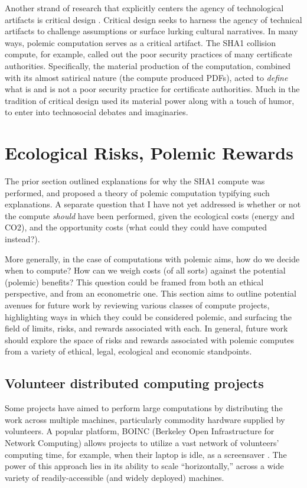 \documentclass[sigconf]{acmart}
\begin{document}
Another strand of research that explicitly centers the agency of technological artifacts
is critical design \cite{Dunne2001}.
Critical design seeks to harness the agency of technical artifacts 
to challenge assumptions or surface lurking cultural narratives.
In many ways, polemic computation serves as a critical artifact.
The SHA1 collision compute, for example, 
called out the poor security practices of many certificate authorities.
Specifically, the material production of the computation,
combined with its almost satirical nature (the compute produced PDFs),
acted to \emph{define} what is and is not a poor security practice for certificate authorities.
Much in the tradition of critical design
used its material power \cite{Bennett2013a} along with a touch of humor, to enter into technosocial debates and imaginaries.


\section{Ecological Risks, Polemic Rewards}
\label{sec:orgbb6df6d}

The prior section outlined explanations for why the SHA1 compute was performed, 
and proposed a theory of polemic computation typifying such explanations.
A separate question that I have not yet addressed 
is whether or not the compute \emph{should} have been performed,
given the ecological costs (energy and CO2), and the opportunity costs (what could they could have computed instead?).

More generally, in the case of computations with polemic aims,
how do we decide when to compute?
How can we weigh costs (of all sorts) against the potential (polemic) benefits?
This question could be framed from both an ethical perspective, 
and from an econometric one.
This section aims to outline potential avenues for future work
by reviewing various classes of compute projects,
highlighting ways in which they could be considered polemic,
and surfacing the field of limits, risks, and rewards associated with each.
In general, future work should explore the space of risks and rewards
associated with polemic computes from a variety of ethical, legal, ecological and economic standpoints.

\subsection{Volunteer distributed computing projects}
\label{sec:org7601b17}

Some projects have aimed to perform large computations by distributing the work across multiple machines,
particularly commodity hardware supplied by volunteers.
A popular platform, BOINC (Berkeley Open Infrastructure for Network Computing)
allows projects to utilize a vast network of volunteers' computing time, 
for example, when their laptop is idle, as a screensaver
\cite{Anderson2004}.
The power of this approach lies in its ability to scale ``horizontally,''
across a wide variety of readily-accessible (and widely deployed) machines.
\end{document}
